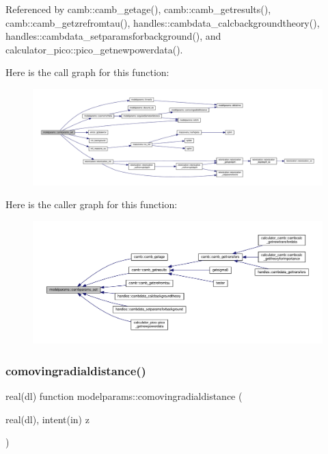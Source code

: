 Referenced by camb\+::camb\+\_\+getage(), camb\+::camb\+\_\+getresults(), camb\+::camb\+\_\+getzrefromtau(), handles\+::cambdata\+\_\+calcbackgroundtheory(), handles\+::cambdata\+\_\+setparamsforbackground(), and calculator\+\_\+pico\+::pico\+\_\+getnewpowerdata().

Here is the call graph for this function\+:
\nopagebreak
\begin{figure}[H]
\begin{center}
\leavevmode
\includegraphics[width=350pt]{namespacemodelparams_a13f805ae3c4213f4c9204bf8d8f17350_cgraph}
\end{center}
\end{figure}
Here is the caller graph for this function\+:
\nopagebreak
\begin{figure}[H]
\begin{center}
\leavevmode
\includegraphics[width=350pt]{namespacemodelparams_a13f805ae3c4213f4c9204bf8d8f17350_icgraph}
\end{center}
\end{figure}
\mbox{\label{namespacemodelparams_ad0393036efc0bf4d20eba5112748a1a2}} 
\subsubsection{\texorpdfstring{comovingradialdistance()}{comovingradialdistance()}}
{\footnotesize\ttfamily real(dl) function modelparams\+::comovingradialdistance (\begin{DoxyParamCaption}\item[{real(dl), intent(in)}]{z }\end{DoxyParamCaption})}



